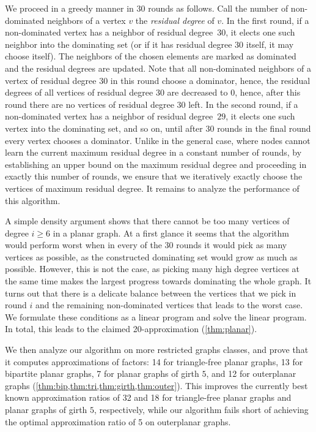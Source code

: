 We proceed in a greedy manner in $30$ rounds as follows.
Call the number of non-dominated neighbors of a vertex $v$ the
\emph{residual degree} of $v$. In the first round, if a non-dominated
vertex has a neighbor of residual degree~$30$, it elects one such neighbor into
the dominating set (or if it has residual degree $30$ itself, it may choose itself).
The neighbors of the chosen elements are
marked as dominated and the residual degrees are updated. Note that
all non-dominated neighbors of a vertex of residual degree $30$
in this round choose a dominator, hence, the residual degrees
of all vertices of residual degree $30$ are decreased to $0$, hence, after
this round there are no vertices of residual degree $30$ left.
In the second round, if a non-dominated vertex has a neighbor
of residual degree~$29$, it elects
one such vertex into the dominating set, and so on, until after $30$ rounds
in the final round every vertex chooses a dominator. Unlike in the general
case, where
nodes cannot learn the current maximum residual degree in a constant
number of rounds, by establishing
an upper bound on the maximum residual degree and proceeding in exactly
this number of rounds, we ensure that we iteratively exactly choose the
vertices of maximum residual degree. It remains to analyze the performance
of this algorithm.


A simple density argument shows
that there cannot be too many vertices of degree $i\geq 6$ in a planar
graph. At a first glance it seems that the algorithm would perform worst
when in every of the $30$ rounds it would pick as many vertices as possible,
as the constructed dominating set would grow as much as possible. However,
this is not the case, as picking many high degree vertices at the same time makes
the largest progress towards dominating the whole graph. It turns
out that there is a delicate balance between the vertices that we pick
in round $i$ and the remaining non-dominated vertices that leads
to the worst case. We formulate these conditions as a
linear program and solve the linear program. In total, this
leads to the claimed 20\hspace{1pt}-\hspace{1pt}approximation (\cref{thm:planar}).

\smallskip
We then analyze our algorithm on more restricted graphs classes, and prove that
it computes approximations of factors: 14 for triangle-free planar graphs,
13 for bipartite planar graphs, 7 for planar graphs of girth $5$, and
12 for outerplanar graphs (\cref{thm:bip,thm:tri,thm:girth,thm:outer}).
This
improves the currently best known approximation ratios of 32
and 18 for triangle-free planar graphs and planar graphs of girth $5$,
respectively, while our algorithm fails short of achieving
the optimal approximation ratio of 5 on outerplanar graphs.

